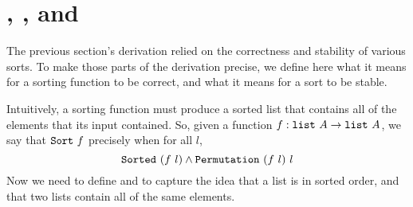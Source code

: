 \documentclass[11pt]{thesis}
\begin{document}



\section{, , and }
\label{sec:sorted_perm_stable}

The previous section's derivation relied on the correctness and stability of
various sorts. To make those parts of the derivation precise, we
define here what it means for a sorting function to be correct, and
what it means for a sort to be stable.

Intuitively, a sorting function must produce a sorted list that
contains all of the elements that its input contained. So, given a function $f : \texttt{list}~A \to \texttt{list}~A$, we say that $\texttt{Sort}~f$ precisely when for all $l$,
\begin{equation*}
  \texttt{Sorted}~(f~l) \land \texttt{Permutation}~(f~l)~l
\end{equation*}
Now we need to define  and  to capture
the idea that a list is in sorted order, and that two lists contain
all of the same elements.

\subsection{}
\label{subsec:sorted}
\end{document}
